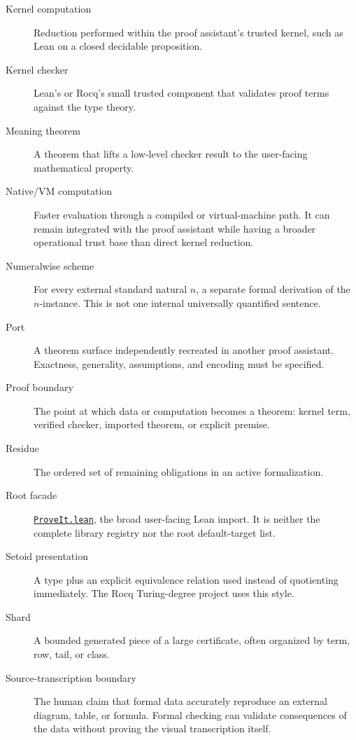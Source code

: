 \documentclass[
  10pt,
  a4paper,
  twoside,
  open=any,
  parskip=half,
  headings=big
]{scrreprt}
\newcommand{\CommitFull}{675d0a2ff0fc624fba199e006049016ba806f40a}
\newcommand{\RepoBlobBase}{https://github.com/VladimirReshetnikov/ProveIt/blob/\CommitFull/}
\newcommand{\RepoFile}[1]{%
  \href{\RepoBlobBase\detokenize{#1}}{\nolinkurl{#1}}}
\newcommand{\code}[1]{\texttt{\detokenize{#1}}}
\begin{document}
\begin{description}
  \item[Kernel computation]
  Reduction performed within the proof assistant's trusted kernel, such as
  Lean \code{decide} on a closed decidable proposition.

  \item[Kernel checker]
  Lean's or Rocq's small trusted component that validates proof terms against
  the type theory.

  \item[Meaning theorem]
  A theorem that lifts a low-level checker result to the user-facing
  mathematical property.

  \item[Native/VM computation]
  Faster evaluation through a compiled or virtual-machine path.  It can remain
  integrated with the proof assistant while having a broader operational trust
  base than direct kernel reduction.

  \item[Numeralwise scheme]
  For every external standard natural \(n\), a separate formal derivation of
  the \(n\)-instance.  This is not one internal universally quantified
  sentence.

  \item[Port]
  A theorem surface independently recreated in another proof assistant.
  Exactness, generality, assumptions, and encoding must be specified.

  \item[Proof boundary]
  The point at which data or computation becomes a theorem: kernel term,
  verified checker, imported theorem, or explicit premise.

  \item[Residue]
  The ordered set of remaining obligations in an active formalization.

  \item[Root facade]
  \RepoFile{ProveIt.lean}, the broad user-facing Lean import.  It is neither
  the complete library registry nor the root default-target list.

  \item[Setoid presentation]
  A type plus an explicit equivalence relation used instead of quotienting
  immediately.  The Rocq Turing-degree project uses this style.

  \item[Shard]
  A bounded generated piece of a large certificate, often organized by term,
  row, tail, or class.

  \item[Source-transcription boundary]
  The human claim that formal data accurately reproduce an external diagram,
  table, or formula.  Formal checking can validate consequences of the data
  without proving the visual transcription itself.


\end{description}
\end{document}
